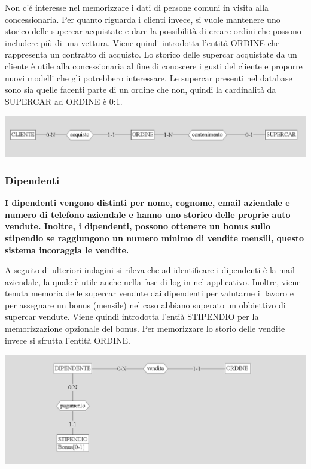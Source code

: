 \documentclass[11pt]{article}
\begin{document}
Non c'é interesse nel memorizzare i dati di persone comuni in visita alla
concessionaria. Per quanto riguarda i clienti invece, si vuole mantenere uno
storico delle supercar acquistate e dare la possibilità di creare ordini che
possono includere più di una vettura. Viene quindi introdotta l'entità ORDINE
che rappresenta un contratto di acquisto. Lo storico delle supercar acquistate
da un cliente è utile alla concessionaria al fine di conoscere i gusti del
cliente e proporre nuovi modelli che gli potrebbero interessare.
Le supercar presenti nel database sono sia quelle facenti parte di un ordine che 
non, quindi la cardinalità da SUPERCAR ad ORDINE è 0:1.

\begin{center}
    \includegraphics[width=\linewidth]{images/ordine.png}
\end{center}

\subsubsection{Dipendenti}
\textbf{I dipendenti vengono distinti per nome, cognome, email aziendale e
numero di telefono aziendale e hanno uno storico delle proprie auto vendute.
Inoltre, i dipendenti, possono ottenere un bonus sullo stipendio se raggiungono
un numero minimo di vendite mensili, questo sistema incoraggia le vendite.}

A seguito di ulteriori indagini si rileva che ad identificare i dipendenti è la
mail aziendale, la quale è utile anche nella fase di log in nel applicativo.
Inoltre, viene tenuta memoria delle supercar vendute dai dipendenti per
valutarne il lavoro e per assegnare un bonus (mensile) nel caso abbiano superato
un obbiettivo di supercar vendute. Viene quindi introdotta l'entià STIPENDIO per
la memorizzazione opzionale del bonus. Per memorizzare lo storio delle vendite
invece si sfrutta l'entità ORDINE.

\begin{center}
    \includegraphics[width=\linewidth]{images/dipendente.png}
\end{center}
\end{document}
